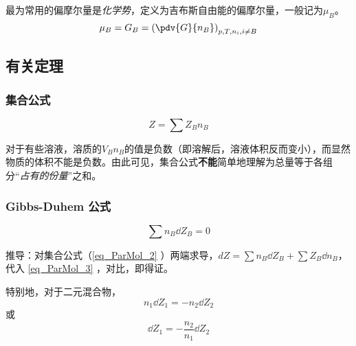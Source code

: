最为常用的偏摩尔量是\textsl{化学势}，定义为吉布斯自由能的偏摩尔量，一般记为$\mu_B$。
\begin{equation}
\mu_B={G_B} = \left(\pdv{G}{n_B}\right)_{p,T,n_i, i \neq B} 
\end{equation}

\subsection{有关定理}
\subsubsection{集合公式}
\begin{equation}\label{eq_ParMol_2}
Z=\sum {Z_B}  n_B
\end{equation}

对于有些溶液，溶质的${V_B}n_B$的值是负数（即溶解后，溶液体积反而变小），而显然物质的体积不能是负数。由此可见，集合公式\textbf{不能}简单地理解为总量等于各组分“\textsl{占有的份量}”之和。

\subsubsection{Gibbs-Duhem 公式}
\begin{equation}
\sum n_B \dd Z_B = 0
\end{equation}

推导：对集合公式（\autoref{eq_ParMol_2} ）两端求导，$dZ=\sum n_B \dd Z_B + \sum {Z_B}  \dd n_B$，代入 \autoref{eq_ParMol_3} ，对比，即得证。

特别地，对于二元混合物，
\begin{equation}
n_1 \dd {Z_1} = - n_2 \dd {Z_2}
\end{equation}
或
\begin{equation}
\dd {Z_1} = -\frac{n_2}{n_1} \dd {Z_2}
\end{equation}

